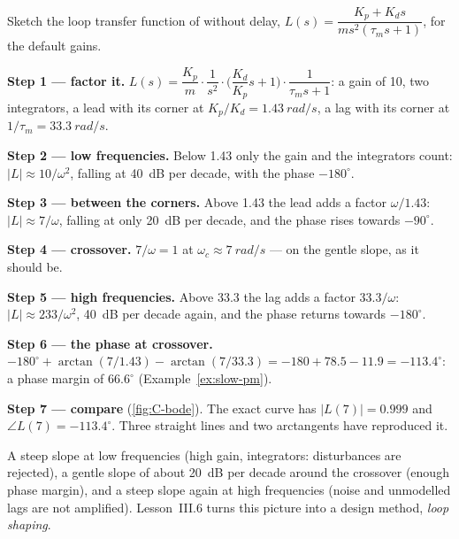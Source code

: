\begin{example}
\label{ex:C-bode}
Sketch the loop transfer function of  without delay, $L(s) = \dfrac{K_p + K_ds}{m s^2(\tau_ms + 1)}$, for the default gains.

\textbf{Step 1 — factor it.} $L(s) = \dfrac{K_p}{m} \cdot \dfrac{1}{s^2} \cdot \Big(\dfrac{K_d}{K_p}s + 1\Big) \cdot \dfrac{1}{\tau_m s + 1}$: a gain of 10, two integrators, a lead with its corner at $K_p/K_d = \SI{1.43}{rad/s}$, a lag with its corner at $1/\tau_m = \SI{33.3}{rad/s}$.

\textbf{Step 2 — low frequencies.} Below 1.43 only the gain and the integrators count: $|L| \approx 10/\omega^2$, falling at \SI{40}{dB} per decade, with the phase $-180^\circ$.

\textbf{Step 3 — between the corners.} Above 1.43 the lead adds a factor $\omega/1.43$: $|L| \approx 7/\omega$, falling at only \SI{20}{dB} per decade, and the phase rises towards $-90^\circ$.

\textbf{Step 4 — crossover.} $7/\omega = 1$ at $\omega_c \approx \SI{7}{rad/s}$ — on the gentle slope, as it should be.

\textbf{Step 5 — high frequencies.} Above 33.3 the lag adds a factor $33.3/\omega$: $|L| \approx 233/\omega^2$, \SI{40}{dB} per decade again, and the phase returns towards $-180^\circ$.

\textbf{Step 6 — the phase at crossover.} $-180^\circ + \arctan(7/1.43) - \arctan(7/33.3) = -180 + 78.5 - 11.9 = -113.4^\circ$: a phase margin of $66.6^\circ$ (Example~\ref{ex:slow-pm}).

\textbf{Step 7 — compare} (\cref{fig:C-bode}). The exact curve has $|L(7)| = 0.999$ and $\angle L(7) = -113.4^\circ$. Three straight lines and two arctangents have reproduced it.
\end{example}


\begin{keyidea}
A steep slope at low frequencies (high gain, integrators: disturbances are rejected), a gentle slope of about \SI{20}{dB} per decade around the crossover (enough phase margin), and a steep slope again at high frequencies (noise and unmodelled lags are not amplified). Lesson~III.6 turns this picture into a design method, \emph{loop shaping}.
\end{keyidea}

